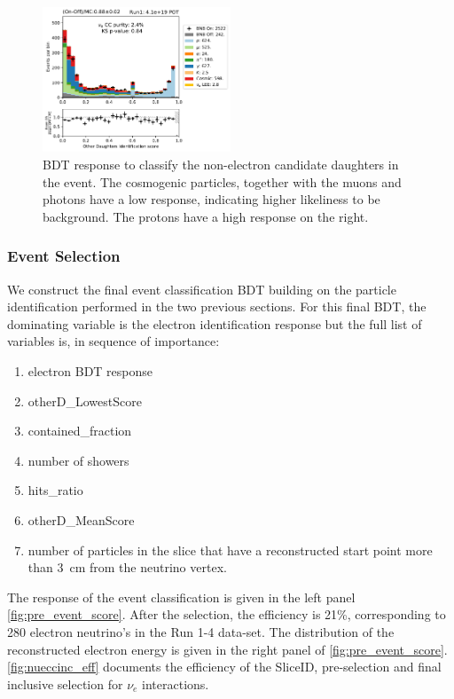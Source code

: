 \begin{figure}
    \centering
    \includegraphics[width=0.5\textwidth]{NueCCsel/Images/run1/pre_daughter_score.pdf}
    \caption{BDT response to classify the non-electron candidate daughters in the event. The cosmogenic particles, together with the muons and photons have a low response, indicating higher likeliness to be background. The protons have a high response on the right.}
    \label{fig:pre_daughter_score}
\end{figure}

\subsubsection{Event Selection}
We construct the final event classification BDT building on the particle identification performed in the two previous sections. For this final BDT, the dominating variable is the electron identification response but the full list of variables is, in sequence of importance:

\begin{enumerate}
    \item electron BDT response
    \item otherD\_LowestScore
    \item contained\_fraction
    \item number of showers
    \item hits\_ratio
    \item otherD\_MeanScore
    \item number of particles in the slice that have a reconstructed start point more than \SI{3}{\cm} from the neutrino vertex.
\end{enumerate}
The response of the event classification is given in the left panel \cref{fig:pre_event_score}. After the selection, the efficiency is 21\%, corresponding to 280 electron neutrino's in the Run 1-4 data-set. The distribution of the reconstructed electron energy is given in the right panel of \cref{fig:pre_event_score}. \cref{fig:nueccinc_eff} documents the efficiency of the SliceID, pre-selection and final inclusive selection for $\nu_e$ interactions.

